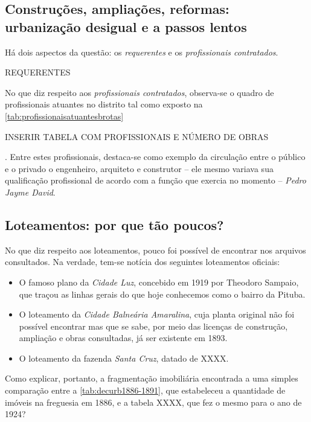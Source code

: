 \subsection{Construções, ampliações, reformas: urbanização desigual e a passos lentos}\label{subsec:constrampliref}

Há dois aspectos da questão: os \textit{requerentes} e os \textit{profissionais contratados}.

REQUERENTES

No que diz respeito aos \textit{profissionais contratados}, observa-se o quadro de profissionais atuantes no distrito tal como exposto na \autoref{tab:profissionaisatuantesbrotas}

INSERIR TABELA COM PROFISSIONAIS E NÚMERO DE OBRAS





 . Entre estes profissionais, destaca-se como exemplo da circulação entre o público e o privado o engenheiro, arquiteto e construtor -- ele mesmo variava sua qualificação profissional de acordo com a função que exercia no momento -- \textit{Pedro Jayme David}. 

\subsection{Loteamentos: por que tão poucos?}\label{subsec:loteamentos}

No que diz respeito aos loteamentos, pouco foi possível de encontrar nos arquivos consultados. Na verdade, tem-se notícia dos seguintes loteamentos oficiais:

\begin{itemize}
\item O famoso plano da \textit{Cidade Luz}, concebido em 1919 por Theodoro Sampaio, que traçou as linhas gerais do que hoje conhecemos como o bairro da Pituba.
\item O loteamento da \textit{Cidade Balneária Amaralina}, cuja planta original não foi possível encontrar mas que se sabe, por meio das licenças de construção, ampliação e obras consultadas, já ser existente em 1893.
\item O loteamento da fazenda \textit{Santa Cruz}, datado de XXXX.
\end{itemize} 

Como explicar, portanto, a fragmentação imobiliária encontrada a uma simples comparação entre a \autoref{tab:decurb1886-1891}, que estabeleceu a quantidade de imóveis na freguesia em 1886, e a tabela XXXX, que fez o mesmo para o ano de 1924?

